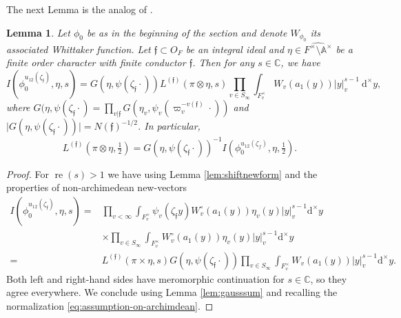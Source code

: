 \documentclass[a4paper,11pt]{amsart}
\newtheorem{lemma}[theorem]{Lemma}
\theoremstyle{definition}
\newcommand{\A}{\mathbb{A}}
\newcommand{\CC}{\mathbb{C}}
\begin{document}
The next Lemma is the analog of \cite[Lemma 11.8]{sparse-equidistribution-venkatesh}. 


\begin{lemma}
    \label{prop:choiceofphi} 
Let $\phi_0$ be as in the beginning of the section and denote $W_{\phi_0}$ its associated Whittaker function.
Let $\mathfrak{f} \subset O_F$ be an integral ideal and $\eta \in \widehat{F^{\times}\setminus\A^{\times}}$ be a finite order character with finite conductor $\mathfrak{f}$. Then for any $s\in \CC$, we have
        \[ I(\phi_0^{u_{12}(\zeta_{\mathfrak{f}})},\eta,s) = G(\eta,\psi(\zeta_{\mathfrak{f}}\cdot)) L^{(\mathfrak{f})}(\pi \otimes \eta,s)\prod_{v\in S_{\infty}} \int_{F_{v}^{\times}}W_{v}(a_1(y))\vert{y}\vert_{v}^{s-1}\ \mathrm{d}^{\times}y,  \]
        where $G(\eta,\psi(\zeta_{\mathfrak{f}}\cdot) = \prod_{v|\mathfrak{f}}G(\eta_v,\psi_v(\varpi_v^{-v(\mathfrak{f})}\cdot))$ and $\vert{G(\eta,\psi(\zeta_{\mathfrak{f}}\cdot))}\vert  =  N(\mathfrak{f})^{-1/2}$.
    In particular,
    \[L^{(\mathfrak{f})}(\pi\otimes \eta,\tfrac{1}{2}) = G(\eta,\psi(\zeta_\mathfrak{f}\cdot))^{-1}I(\phi_0^{u_{12}(\zeta_f)},\eta,\tfrac{1}{2}).\]
\end{lemma}
\begin{proof}
    
    For $\operatorname{re}(s)>1$ we have using Lemma \ref{lem:shiftnewform} and the properties of non-archimedean new-vectors \begin{align*}
    I(\phi_0^{u_{12}(\zeta_{\mathfrak{f}})},\eta,s) =&  
          \prod_{v<\infty} \int_{F_v^{\times}}\psi_v({\zeta_{\mathfrak{f}}y})W^{\circ}_{v}(a_{1}(y))\eta_v(y)\vert{y}\vert_v^{s-1}\mathrm{d}^{\times}y\  \\&\times\prod_{v\in S_{\infty}}\int_{F_v^{\times}}W^{\circ}_{v}(a_{1}(y))\eta_v(y)\vert{y}\vert_v^{s-1}\mathrm{d}^{\times}y
         \\ =&L^{(\mathfrak{f})}(\pi\times\eta,s)G(\eta,\psi(\zeta_{\mathfrak{f}}\cdot))\prod_{v\in S_{\infty}}\int_{F_{v}^{\times}}W_{v}(a_{1}(y))\vert{y}\vert_v^{s-1}\mathrm{d}^{\times}y.
    \end{align*}
    Both left and right-hand sides have meromorphic continuation for $s\in \CC$, so they agree everywhere. We conclude using Lemma \ref{lem:gausssum} and recalling the normalization \eqref{eq:assumption-on-archimdean}.
    \end{proof}
\end{document}
